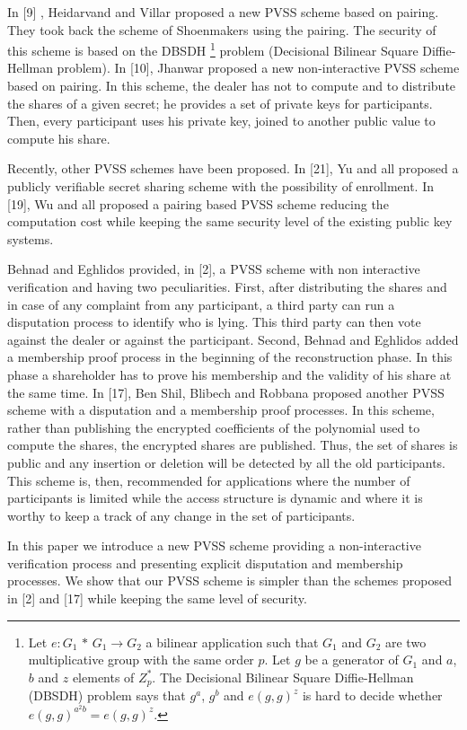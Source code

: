 \documentclass[submission,copyright,creativecommons]{eptcs}
\begin{document}
In [9] , Heidarvand and Villar proposed a new PVSS scheme based on pairing.
They took back the scheme of Shoenmakers using the pairing. The security of
this scheme is based on the DBSDH \footnote{Let $e:G_{1}$ $\ast $ $G_{1}\rightarrow G_{2}$ a bilinear application such
that $G_{1}$ and $G_{2}$ are two multiplicative group with the same order $p$. Let $g$ be a generator of $G_{1}$ and $a$, $b$ and $z$ elements of $Z_{p}^{\ast }$. The Decisional Bilinear Square Diffie-Hellman (DBSDH)
problem says that $g^{a}$, $g^{b}$ and $e(g,g)^{z}$ is hard to decide
whether $e(g,g)^{a^{2}b}=e(g,g)^{z}$.} problem (Decisional Bilinear Square
Diffie-Hellman problem). In [10], Jhanwar proposed a new non-interactive
PVSS scheme based on pairing. In this scheme, the dealer has not to compute
and to distribute the shares of a given secret; he provides a set of private
keys for participants. Then, every participant uses his private key, joined
to another public value to compute his share.

Recently, other PVSS schemes have been proposed. In [21], Yu and all proposed
a publicly verifiable secret sharing scheme with the possibility of
enrollment. In [19], Wu and all proposed a pairing based PVSS scheme reducing
the computation cost while keeping the same security level of the existing
public key systems.

Behnad and Eghlidos provided, in [2], a PVSS scheme with non interactive
verification and having two peculiarities. First, after distributing the
shares and in case of any complaint from any participant, a third party can
run a disputation process to identify who is lying. This third party can
then vote against the dealer or against the participant. Second, Behnad and
Eghlidos added a membership proof process in the beginning of the
reconstruction phase. In this phase a shareholder has to prove his
membership and the validity of his share at the same time. In [17], Ben
Shil, Blibech and Robbana proposed another PVSS scheme with a disputation
and a membership proof processes. In this scheme, rather than publishing the
encrypted coefficients of the polynomial used to compute the shares, the
encrypted shares are published. Thus, the set of shares is public and any
insertion or deletion will be detected by all the old participants. This
scheme is, then, recommended for applications where the number of
participants is limited while the access structure is dynamic and where it
is worthy to keep a track of any change in the set of participants.

In this paper we introduce a new PVSS scheme providing a non-interactive
verification process and presenting explicit disputation and membership
processes. We show that our PVSS scheme is simpler than the schemes proposed
in [2] and [17] while keeping the same level of security.
\end{document}
